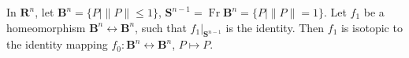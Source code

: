In $\mathbf{R}^n$, let $\mathbf{B}^n = \{P \mid \|P\| \leq 1\}$, $\mathbf{S}^{n-1} = \operatorname{Fr} \mathbf{B}^n = \{P \mid \|P\| = 1\}$. Let $f_1$ be a homeomorphism $\mathbf{B}^n \leftrightarrow \mathbf{B}^n$, such that $f_1|_{\mathbf{S}^{n-1}}$ is the identity. Then $f_1$ is isotopic to the identity mapping $f_0: \mathbf{B}^n \leftrightarrow \mathbf{B}^n$, $P \mapsto P$.

